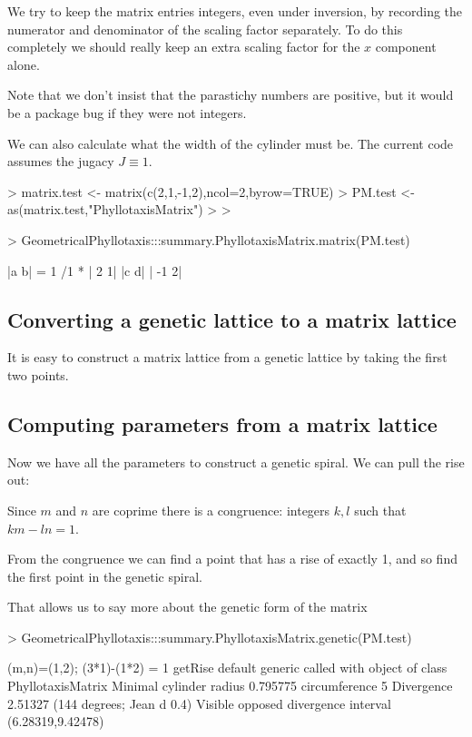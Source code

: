 \documentclass[a4paper]{article}
\begin{document}
We try to keep the matrix entries integers, even under inversion, by recording the numerator and denominator of the scaling factor separately. To do this completely we should really keep an extra scaling factor for the $x$ component alone.


Note that we don't insist that the parastichy numbers are positive, but it would be a package bug if they were not integers.

We can also calculate what the width of the cylinder must be. The current code assumes the jugacy $J\equiv 1$.
\begin{Schunk}
\begin{Sinput}
> matrix.test <- matrix(c(2,1,-1,2),ncol=2,byrow=TRUE)
> PM.test <- as(matrix.test,"PhyllotaxisMatrix")
> 
> 
\end{Sinput}
\end{Schunk}



\begin{Schunk}
\begin{Sinput}
> GeometricalPhyllotaxis:::summary.PhyllotaxisMatrix.matrix(PM.test)
\end{Sinput}
\begin{Soutput}
|a	b|  = 1  /1   *  |  2	  1|
|c	d|               | -1	  2|
\end{Soutput}
\end{Schunk}


\subsection{Converting a genetic lattice to a matrix lattice}
It is easy to construct a matrix lattice from a genetic lattice by taking the first two points.

\subsection{Computing parameters from a matrix lattice}
Now we have all the parameters to construct a genetic spiral.
We can pull the rise out:

Since $m$ and $n$ are coprime there is a congruence: integers $k,l$ such that $km -l n=1$.

From the congruence we can find a point that has a rise of exactly 1, and so find the first point in
the genetic spiral.




That allows us to say more about the genetic form of the matrix
\begin{Schunk}
\begin{Sinput}
> GeometricalPhyllotaxis:::summary.PhyllotaxisMatrix.genetic(PM.test)
\end{Sinput}
\begin{Soutput}
(m,n)=(1,2); (3*1)-(1*2) = 1
getRise default generic called with object of class PhyllotaxisMatrix
Minimal cylinder radius 0.795775 circumference 5 
Divergence 2.51327 (144 degrees; Jean d 0.4)
Visible opposed divergence interval (6.28319,9.42478)
\end{Soutput}
\end{Schunk}
\end{document}
